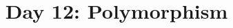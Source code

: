 \documentclass{article}
\begin{document}
\title{Day 12: Polymorphism}
\author{}
\date{}
\maketitle




\end{document}
